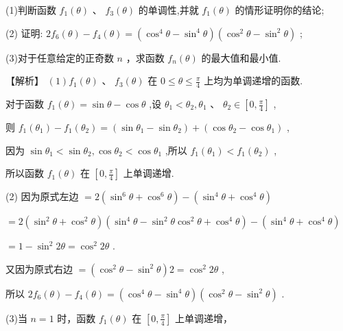 \documentclass[10pt]{article}
\begin{document}
(1)判断函数 \({f}_{1}\left( \theta \right)\) 、 \({f}_{3}\left( \theta \right)\) 的单调性,并就 \({f}_{1}\left( \theta \right)\) 的情形证明你的结论;

(2) 证明: \(2{f}_{6}\left( \theta \right)  - {f}_{4}\left( \theta \right)  = \left( {{\cos }^{4}\theta  - {\sin }^{4}\theta }\right) \left( {{\cos }^{2}\theta  - {\sin }^{2}\theta }\right)\) ;

(3)对于任意给定的正奇数 \(n\) ，求函数 \({f}_{n}\left( \theta \right)\) 的最大值和最小值.

【解析】 \(\left( 1\right) {f}_{1}\left( \theta \right) \text{ 、 }{f}_{3}\left( \theta \right)\) 在 \(0 \leq  \theta  \leq  \frac{\pi }{4}\) 上均为单调递增的函数.

对于函数 \({f}_{1}\left( \theta \right)  = \sin \theta  - \cos \theta\) ,设 \({\theta }_{1} < {\theta }_{2},{\theta }_{1}\text{ 、 }{\theta }_{2} \in  \left\lbrack  {0,\frac{\pi }{4}}\right\rbrack\) ,

则 \({f}_{1}\left( {\theta }_{1}\right)  - {f}_{1}\left( {\theta }_{2}\right)  = \left( {\sin {\theta }_{1} - \sin {\theta }_{2}}\right)  + \left( {\cos {\theta }_{2} - \cos {\theta }_{1}}\right)\) ,

因为 \(\sin {\theta }_{1} < \sin {\theta }_{2},\cos {\theta }_{2} < \cos {\theta }_{1}\) ,所以 \({f}_{1}\left( {\theta }_{1}\right)  < {f}_{1}\left( {\theta }_{2}\right)\) ,

所以函数 \({f}_{1}\left( \theta \right)\) 在 \(\left\lbrack  {0,\frac{\pi }{4}}\right\rbrack\) 上单调递增.

(2) 因为原式左边 \(= 2\left( {{\sin }^{6}\theta  + {\cos }^{6}\theta }\right)  - \left( {{\sin }^{4}\theta  + {\cos }^{4}\theta }\right)\)

\(= 2\left( {{\sin }^{2}\theta  + {\cos }^{2}\theta }\right) \left( {{\sin }^{4}\theta  - {\sin }^{2}\theta {\cos }^{2}\theta  + {\cos }^{4}\theta }\right)  - \left( {{\sin }^{4}\theta  + {\cos }^{4}\theta }\right)\)

\(= 1 - {\sin }^{2}{2\theta } = {\cos }^{2}{2\theta }\) .

又因为原式右边 \(= \left( {{\cos }^{2}\theta  - {\sin }^{2}\theta }\right) 2 = {\cos }^{2}{2\theta }\) ,

所以 \(2{f}_{6}\left( \theta \right)  - {f}_{4}\left( \theta \right)  = \left( {{\cos }^{4}\theta  - {\sin }^{4}\theta }\right) \left( {{\cos }^{2}\theta  - {\sin }^{2}\theta }\right)\) .

(3)当 \(n = 1\) 时，函数 \({f}_{1}\left( \theta \right)\) 在 \(\left\lbrack  {0,\frac{\pi }{4}}\right\rbrack\) 上单调递增，
\end{document}
